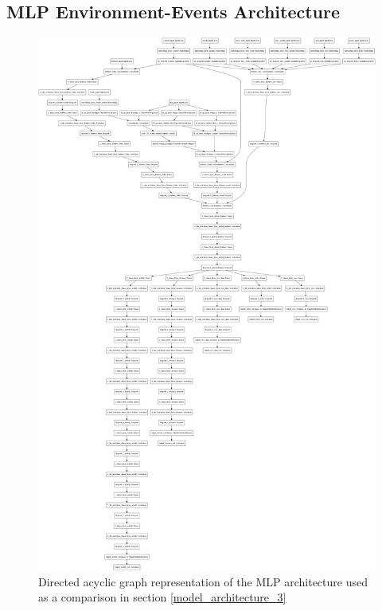 \subsection{MLP Environment-Events Architecture}
\begin{figure}[H]
\centering
\includegraphics[width=\textwidth,height=0.7\textheight,keepaspectratio]{images/appendix_B/mlp_3.png}
\caption[\textbf{MLP DAG - Section \ref{model_architecture_3}}]{Directed acyclic graph representation of the MLP architecture used as a comparison in section \ref{model_architecture_3}}
\label{mlp_3_dag}
\end{figure}


